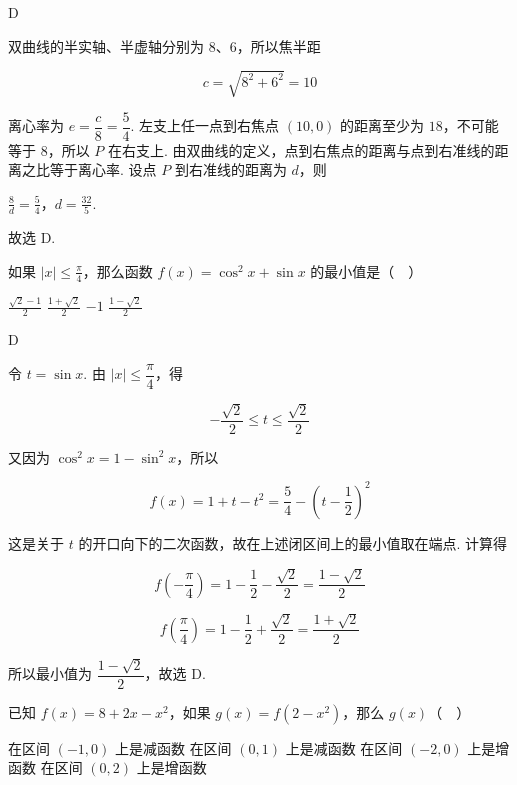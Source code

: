 \documentclass[UTF8,a4paper,oneside,11pt]{ctexbook}
\begin{document}
\begin{answer}
D
\end{answer}

\begin{solution}
双曲线的半实轴、半虚轴分别为 \(8\)、\(6\)，所以焦半距

\[c=\sqrt{8^2+6^2}=10\]

离心率为 \(e=\dfrac{c}{8}=\dfrac54\). 左支上任一点到右焦点 \((10,0)\) 的距离至少为 \(18\)，不可能等于 \(8\)，所以 \(P\) 在右支上. 由双曲线的定义，点到右焦点的距离与点到右准线的距离之比等于离心率. 设点 \(P\) 到右准线的距离为 \(d\)，则

\(\frac{8}{d}=\frac54\)，\(d=\frac{32}{5}\).

故选 D.
\end{solution}

\begin{problem}
如果 \(|x| \leqslant \frac{\pi}{4}\)，那么函数 \(f(x) = \cos^2 x + \sin x\) 的最小值是（\(\quad\)）

\choices
    {\(\frac{\sqrt{2} - 1}{2}\)}
    {\(\frac{1 + \sqrt{2}}{2}\)}
    {\(-1\)}
    {\(\frac{1 - \sqrt{2}}{2}\)}
\end{problem}

\begin{answer}
D
\end{answer}

\begin{solution}
令 \(t=\sin x\). 由 \(|x|\leqslant\dfrac\pi4\)，得

\[-\frac{\sqrt2}{2}\leqslant t\leqslant\frac{\sqrt2}{2}\]

又因为 \(\cos^2x=1-\sin^2x\)，所以

\[f(x)=1+t-t^2=\frac54-\left(t-\frac12\right)^2\]

这是关于 \(t\) 的开口向下的二次函数，故在上述闭区间上的最小值取在端点. 计算得

\[f\left(-\frac\pi4\right)=1-\frac12-\frac{\sqrt2}{2}=\frac{1-\sqrt2}{2}\]

\[f\left(\frac\pi4\right)=1-\frac12+\frac{\sqrt2}{2}=\frac{1+\sqrt2}{2}\]

所以最小值为 \(\dfrac{1-\sqrt2}{2}\)，故选 D.
\end{solution}

\begin{problem}
已知 \(f(x) = 8 + 2x - x^2\)，如果 \(g(x) = f(2 - x^2)\)，那么 \(g(x)\)（\(\quad\)）

\choices
    {在区间 \((-1,0)\) 上是减函数}
    {在区间 \((0,1)\) 上是减函数}
    {在区间 \((-2,0)\) 上是增函数}
    {在区间 \((0,2)\) 上是增函数}
\end{problem}
\end{document}
